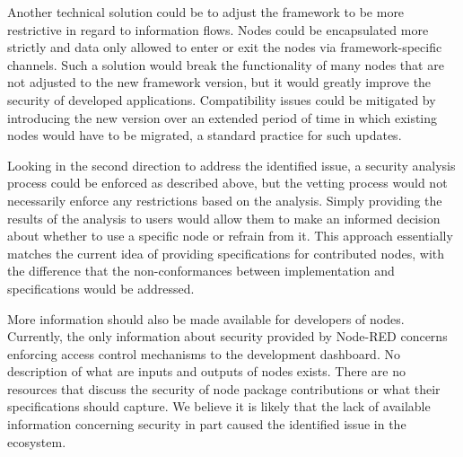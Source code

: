 Another technical solution could be to adjust the framework to be more restrictive in regard to information flows. 
Nodes could be encapsulated more strictly and data only allowed to enter or exit the nodes via framework-specific channels. 
Such a solution would break the functionality of many nodes that are not adjusted to the new framework version, but it would greatly improve the security of developed applications.
Compatibility issues could be mitigated by introducing the new version over an extended period of time in which existing nodes would have to be migrated, a standard practice for such updates.

Looking in the second direction to address the identified issue, a security analysis process could be enforced as described above, but the vetting process would not necessarily enforce any restrictions based on the analysis.
Simply providing the results of the analysis to users would allow them to make an informed decision about whether to use a specific node or refrain from it.
This approach essentially matches the current idea of providing specifications for contributed nodes, with the difference that the non-conformances between implementation and specifications would be addressed.

More information should also be made available for developers of nodes.
Currently, the only information about security provided by Node-RED concerns enforcing access control mechanisms to the development dashboard.
No description of what are inputs and outputs of nodes exists.
There are no resources that discuss the security of node package contributions or what their specifications should capture.
We believe it is likely that the lack of available information concerning security in part caused the identified issue in the ecosystem.



